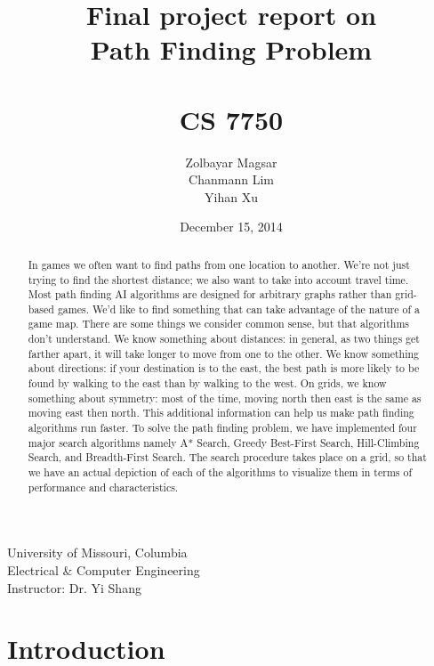 \documentclass[a4paper]{article}
\title{Final project report on \\Path Finding Problem \\~ \\ CS 7750} %
\author{Zolbayar Magsar \\Chanmann Lim \\Yihan Xu}
\date{December 15, 2014}
\begin{document}
\maketitle %

\lstset{language=Java,title=\lstname,basicstyle=\footnotesize}

\begin{center}
University of Missouri, Columbia \\
Electrical \& Computer Engineering \\
Instructor: Dr. Yi Shang
\end{center}

\vspace{1 in}

\begin{abstract}
In games we often want to find paths from one location to another. We’re not just trying to find the shortest distance; we also want to take into account travel time. Most path finding AI algorithms are designed for arbitrary graphs rather than grid-based games. We’d like to find something that can take advantage of the nature of a game map. There are some things we consider common sense, but that algorithms don’t understand. We know something about distances: in general, as two things get farther apart, it will take longer to move from one to the other. We know something about directions: if your destination is to the east, the best path is more likely to be found by walking to the east than by walking to the west. On grids, we know something about symmetry: most of the time, moving north then east is the same as moving east then north. This additional information can help us make path finding algorithms run faster. 
To solve the path finding problem, we have implemented four major search algorithms namely A* Search, Greedy Best-First Search, Hill-Climbing Search, and Breadth-First Search. The search procedure takes place on a grid, so that we have an actual depiction of each of the algorithms to visualize them in terms of performance and characteristics.
\end{abstract}

\vfill


\section{Introduction}
\end{document}
